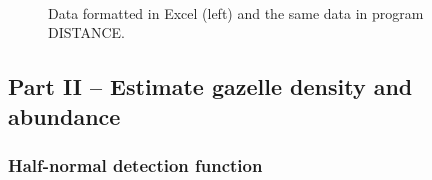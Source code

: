 \documentclass[12pt]{article}\usepackage[]{graphicx}\usepackage[]{color}
\begin{document}
\begin{figure}[h!]
  \centering
   \hfill
     \\
  \caption{\small Data formatted in Excel (left) and the same data in
    program DISTANCE.} 
  \label{fig:ds-data}
\end{figure}



\clearpage

\subsection*{\large  Part II -- Estimate gazelle density and abundance}

\subsubsection*{\normalsize Half-normal detection function}
\end{document}
